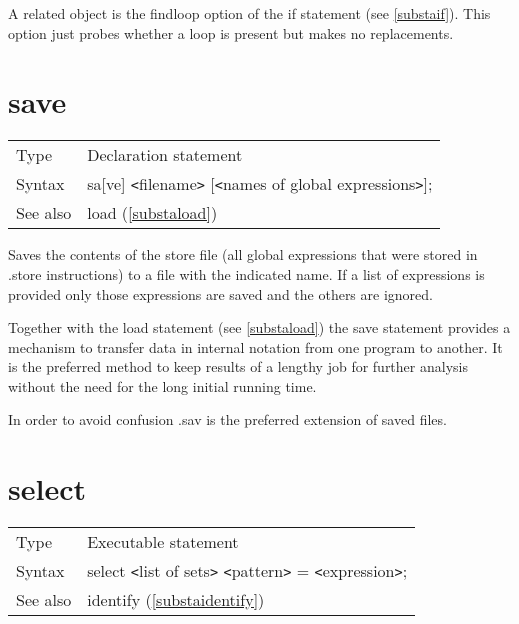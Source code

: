 \noindent A related object is the findloop option of the 
if statement (see \ref{substaif}). This option just probes 
whether a loop is present but makes no replacements.\vspace{10mm}


\section{save}
\label{substasave}

\noindent \begin{tabular}{ll}
Type & Declaration statement\\
Syntax & sa[ve] {\tt<}filename{\tt>} [{\tt<}names of global expressions{\tt>}];
\\ See also & load (\ref{substaload})
\end{tabular}\vspace{4mm}

\noindent Saves the contents of the store 
file (all global expressions that were stored in 
.store 
instructions) to a file with the indicated name. If a list of expressions 
is provided only those expressions are saved and the others are ignored. 

\noindent Together with the load statement (see 
\ref{substaload}) the save statement provides a mechanism to transfer data 
in internal notation from one program to another. It is the preferred method 
to keep results of a lengthy job for further analysis without the need for 
the long initial running time.

\noindent In order to avoid confusion .sav\label{ex:sav} is the 
preferred extension of saved files.\vspace{10mm}


\section{select}
\label{substaselect}

\noindent \begin{tabular}{ll}
Type & Executable statement\\
Syntax & select {\tt<}list of sets{\tt>} {\tt<}pattern{\tt>} = {\tt<}expression{\tt>};
\\ See also & identify (\ref{substaidentify})
\end{tabular} \vspace{4mm}

